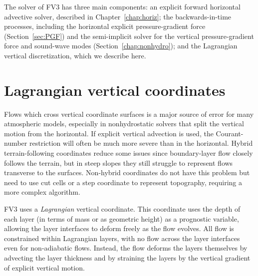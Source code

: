 \documentclass[10pt,letterpaper,margin=1in]{memoir}
\begin{document}
The solver of FV3 has three main components: an explicit forward horizontal advective solver, described in Chapter~\ref{chap:horiz}; the backwards-in-time processes, including the horizontal explicit pressure-gradient force (Section~\ref{sec:PGF}) and the semi-implicit solver for the vertical pressure-gradient force and sound-wave modes (Section~\ref{chap:nonhydro}); and the Lagrangian vertical discretization, which we describe here.


\section{Lagrangian vertical coordinates} \label{sec:VLcoords}

Flows which cross vertical coordinate surfaces is a major source of error for many atmospheric models, especially in nonhydrostatic solvers that split the vertical motion from the horizontal. If explicit vertical advection is used, the Courant-number restriction will often be much more severe than in the horizontal. Hybrid terrain-following coordinates reduce some issues since boundary-layer flow closely follows the terrain, but in steep slopes they still struggle to represent flows transverse to the surfaces. Non-hybrid coordinates do not have this problem but need to use cut cells or a step coordinate to represent topography, requiring a more complex algorithm.

FV3 uses a \textit{Lagrangian} vertical coordinate. This coordinate uses the depth of each layer (in terms of mass or as geometric height) as a prognostic variable, allowing the layer interfaces to deform freely as the flow evolves. All flow is constrained within Lagrangian layers, with no flow across the layer interfaces even for non-adiabatic flows. Instead, the flow deforms the layers themselves by advecting the layer thickness and by straining the layers by the vertical gradient of explicit vertical motion. 
\end{document}
